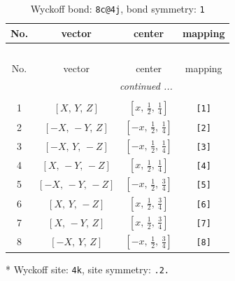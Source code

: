 \documentclass[fleqn,8pt]{jsarticle}
\begin{document}
\renewcommand{\arraystretch}{1.2}
\begin{longtable}{cccc}
\caption{Wyckoff bond: {\tt 8c@4j}, bond symmetry: {\tt 1}}
 \\
 \hline \hline
No. & vector & center & mapping \\ \hline \endfirsthead

\multicolumn{3}{l}{\tablename\ \thetable{}} \\
 \hline \hline
No. & vector & center & mapping \\ \hline \endhead

 \hline \hline
\multicolumn{3}{r}{\footnotesize\it continued ...} \\ \endfoot

 \hline \hline
\multicolumn{3}{r}{} \\ \endlastfoot

1 & $\left[ X,\, Y,\, Z \right]$ & $\left[ x,\, \frac{1}{2},\, \frac{1}{4} \right]$ & {\tt [1]} \\ \hline
2 & $\left[ - X,\, - Y,\, Z \right]$ & $\left[ - x,\, \frac{1}{2},\, \frac{1}{4} \right]$ & {\tt [2]} \\ \hline
3 & $\left[ - X,\, Y,\, - Z \right]$ & $\left[ - x,\, \frac{1}{2},\, \frac{1}{4} \right]$ & {\tt [3]} \\ \hline
4 & $\left[ X,\, - Y,\, - Z \right]$ & $\left[ x,\, \frac{1}{2},\, \frac{1}{4} \right]$ & {\tt [4]} \\ \hline
5 & $\left[ - X,\, - Y,\, - Z \right]$ & $\left[ - x,\, \frac{1}{2},\, \frac{3}{4} \right]$ & {\tt [5]} \\ \hline
6 & $\left[ X,\, Y,\, - Z \right]$ & $\left[ x,\, \frac{1}{2},\, \frac{3}{4} \right]$ & {\tt [6]} \\ \hline
7 & $\left[ X,\, - Y,\, Z \right]$ & $\left[ x,\, \frac{1}{2},\, \frac{3}{4} \right]$ & {\tt [7]} \\ \hline
8 & $\left[ - X,\, Y,\, Z \right]$ & $\left[ - x,\, \frac{1}{2},\, \frac{3}{4} \right]$ & {\tt [8]} \\
\end{longtable}
* Wyckoff site: {\tt 4k}, site symmetry: {\tt .2.}
\renewcommand{\arraystretch}{1.2}
\end{document}
